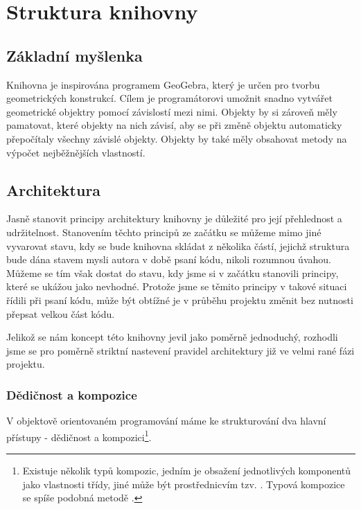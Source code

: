 \chapter{Struktura knihovny}
\label{chap:strucutre}

\section{Základní myšlenka}
\label{sec:basic-idea}

Knihovna je inspirována programem GeoGebra, který je určen pro tvorbu geometrických konstrukcí. 
Cílem je programátorovi umožnit snadno vytvářet geometrické objektry pomocí závislostí mezi nimi.
Objekty by si zároveň měly pamatovat, které objekty na nich závisí, aby se při změně objektu automaticky přepočítaly všechny závislé objekty.
Objekty by také měly obsahovat metody na výpočet nejběžnějších vlastností.

\section{Architektura}
\label{sec:architecture}

Jasně stanovit principy architektury knihovny je důležité pro její přehlednost a udržitelnost.
Stanovením těchto principů ze začátku se můžeme mimo jiné vyvarovat stavu, kdy se bude knihovna skládat z několika částí, jejichž struktura bude dána stavem mysli autora v době psaní kódu, nikoli rozumnou úvahou.
Můžeme se tím však dostat do stavu, kdy jsme si v začátku stanovili principy, které se ukážou jako nevhodné. 
Protože jsme se těmito principy v takové situaci řídili při psaní kódu, může být obtížné je v průběhu projektu změnit bez nutnosti přepsat velkou část kódu.

Jelikož se nám koncept této knihovny jevil jako poměrně jednoduchý, rozhodli jsme se pro poměrně striktní nastevení pravidel architektury již ve velmi rané fázi projektu.

\subsection{Dědičnost a kompozice}
\label{subsec:inheritance-composition}

V objektově orientovaném programování máme ke strukturování dva hlavní přístupy - dědičnost\cite{wikipedia:inheritance} a kompozici\footnote{Existuje několik typů kompozic, jedním je obsažení jednotlivých komponentů jako vlastnosti třídy, jiné může být prostřednicvím tzv. \cite{Rust:traits}. Typová kompozice se spíše podobná metodě . }.

